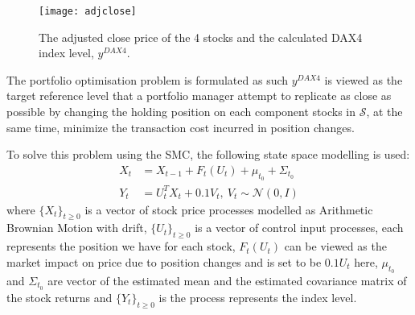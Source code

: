 \begin{figure}[htbp]
\centering
\texttt{[image: adjclose]}
\caption{The adjusted close price of the 4 stocks and the calculated DAX4 index level, $y^{DAX4}$.}
\label{fig:adjclose}
\end{figure}
 
The portfolio optimisation problem is formulated as such $y^{DAX4}$ is viewed as the target reference level that a portfolio manager attempt to replicate as close as possible by changing the holding position on each component stocks in $\mathcal{S}$, at the same time, minimize the transaction cost incurred in position changes.
 
To solve this problem using the SMC,  the following state space modelling is used:
\begin{align}
  X_t &= X_{t-1} + F_t(U_t) + \mu_{t_0} + \Sigma_{t_0} \\
  Y_t &= U^T_tX_t + 0.1V_t,~V_t \sim \mathcal{N}(0, I)
\end{align}
where $\{X_t\}_{t \geq 0}$ is a vector of stock price processes modelled as Arithmetic Brownian Motion with drift, $\{U_t\}_{t \geq 0}$ is a vector of control input processes, each represents the position we have for each stock, $F_t(U_t)$ can be viewed as the market impact on price due to position changes and is set to be $0.1U_t$ here, $\mu_{t_0}$ and $\Sigma_{t_0}$ are vector of the estimated mean and the estimated covariance matrix of the stock returns and $\{Y_t\}_{t \geq 0}$ is the process represents the index level.

